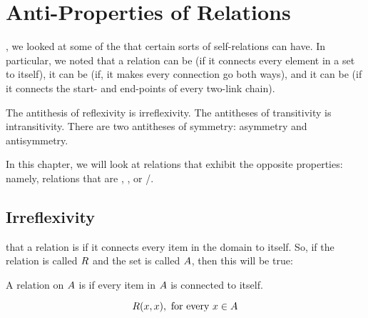 \documentclass[../../../main.tex]{subfiles}
\begin{document}
\chapter{Anti-Properties of Relations}
\label{ch:anti-properties-of-relations}

, we looked at some of the  that certain sorts of self-relations can have. In particular, we noted that a relation can be  (if it connects every element in a set to itself), it can be  (if, it makes every connection go both ways), and it can be  (if it connects the start- and end-points of every two-link chain).

\begin{aside}
  \begin{remark}
    The antithesis of reflexivity is irreflexivity. The antitheses of transitivity is intransitivity. There are two antitheses of symmetry: asymmetry and antisymmetry.
  \end{remark}
\end{aside}

In this chapter, we will look at relations that exhibit the opposite properties: namely, relations that are , , or /.


\section{Irreflexivity}

 that a relation is  if it connects every item in the domain to itself. So, if the relation is called $R$ and the set is called $A$, then this will be true:

\begin{terminology}
  A relation on $A$ is  if every item in $A$ is connected to itself.
\end{terminology}

\begin{equation*}
  R(x, x), \text{ for every } x \in A
\end{equation*}
\end{document}
